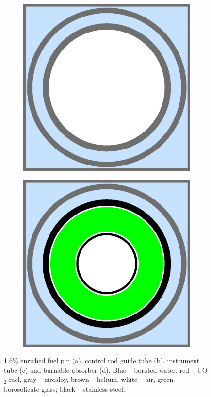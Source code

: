 \begin{figure}[h!]
\begin{subfigure}{.5\textwidth}
  \caption{}
  \label{fig:chap7-pin-3.1}
\end{subfigure}
\begin{subfigure}{.5\textwidth}
  \centering
  \includegraphics[width=0.9\linewidth]{figures/benchmarks/instr-tube}
  \caption{}
  \label{fig:chap7-guide-tube}
\end{subfigure}%
\begin{subfigure}{.5\textwidth}
  \centering
  \includegraphics[width=0.9\linewidth]{figures/benchmarks/burn-abs}
  \caption{}
  \label{fig:chap7-instr-tube}
\end{subfigure}%
\caption[BEAVRS pin cell geometries]{1.6\% enriched fuel pin (a), control rod guide tube (b), instrument tube (c) and burnable absorber (d). Blue -- borated water, red -- UO$_2$ fuel, gray -- zircaloy, brown -- helium, white -- air, green -- borosolicate glass; black -- stainless steel.}
\label{fig:chap7-pin-cells}
\end{figure}

